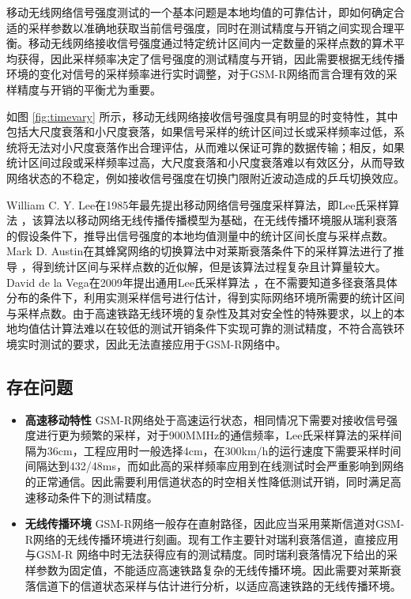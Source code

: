移动无线网络信号强度测试的一个基本问题是本地均值的可靠估计，即如何确定合适的采样参数以准确地获取当前信号强度，同时在测试精度与开销之间实现合理平衡。移动无线网络接收信号强度通过特定统计区间内一定数量的采样点数的算术平均获得，因此采样频率决定了信号强度的测试精度与开销，因此需要根据无线传播环境的变化对信号的采样频率进行实时调整，对于GSM-R网络而言合理有效的采样精度与开销的平衡尤为重要。

如图 \ref{fig:timevary} 所示，移动无线网络接收信号强度具有明显的时变特性，其中包括大尺度衰落和小尺度衰落，如果信号采样的统计区间过长或采样频率过低，系统将无法对小尺度衰落作出合理评估，从而难以保证可靠的数据传输；相反，如果统计区间过段或采样频率过高，大尺度衰落和小尺度衰落难以有效区分，从而导致网络状态的不稳定，例如接收信号强度在切换门限附近波动造成的乒乓切换效应。

William C. Y. Lee在1985年最先提出移动网络信号强度采样算法，即Lee氏采样算法 \cite{lee1985estimate}，该算法以移动网络无线传播传播模型为基础，在无线传播环境服从瑞利衰落的假设条件下，推导出信号强度的本地均值测量中的统计区间长度与采样点数。Mark D. Austin在其蜂窝网络的切换算法中对莱斯衰落条件下的采样算法进行了推导 \cite{Austin1994}，得到统计区间与采样点数的近似解，但是该算法过程复杂且计算量较大。David de la Vega在2009年提出通用Lee氏采样算法 \cite{Vega2009}，在不需要知道多径衰落具体分布的条件下，利用实测采样信号进行估计，得到实际网络环境所需要的统计区间与采样点数。由于高速铁路无线环境的复杂性及其对安全性的特殊要求，以上的本地均值估计算法难以在较低的测试开销条件下实现可靠的测试精度，不符合高铁环境实时测试的要求，因此无法直接应用于GSM-R网络中。

\subsection{存在问题}
\label{sec:prob3}

\begin{itemize}
  \item \textbf{高速移动特性}
  GSM-R网络处于高速运行状态，相同情况下需要对接收信号强度进行更为频繁的采样，对于900MMHz的通信频率，Lee氏采样算法的采样间隔为36cm，工程应用时一般选择4cm，在300km/h的运行速度下需要采样时间间隔达到432/48ms，而如此高的采样频率应用到在线测试时会严重影响到网络的正常通信。因此需要利用信道状态的时空相关性降低测试开销，同时满足高速移动条件下的测试精度。
  \item \textbf{无线传播环境}
  GSM-R网络一般存在直射路径，因此应当采用莱斯信道对GSM-R网络的无线传播环境进行刻画。现有工作主要针对瑞利衰落信道，直接应用与GSM-R 网络中时无法获得应有的测试精度。同时瑞利衰落情况下给出的采样参数为固定值，不能适应高速铁路复杂的无线传播环境。因此需要对莱斯衰落信道下的信道状态采样与估计进行分析，以适应高速铁路的无线传播环境。
\end{itemize}

